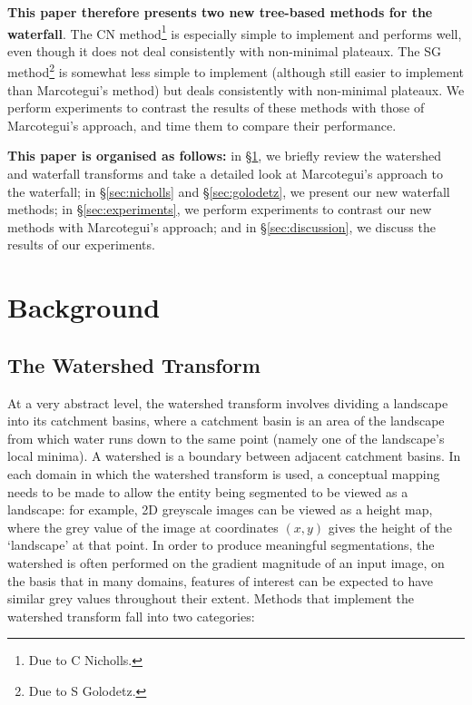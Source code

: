 \documentclass[preprint,a4paper]{elsarticle}
\begin{document}
\pagebreak

\textbf{This paper therefore presents two new tree-based methods for the waterfall}. The CN method\footnote{Due to C Nicholls.} is especially simple to implement and performs well, even though it does not deal consistently with non-minimal plateaux. The SG method\footnote{Due to S Golodetz.} is somewhat less simple to implement (although still easier to implement than Marcotegui's method) but deals consistently with non-minimal plateaux. We perform experiments to contrast the results of these methods with those of Marcotegui's approach, and time them to compare their performance.

\textbf{This paper is organised as follows:} in \S\ref{sec:background}, we briefly review the watershed and waterfall transforms and take a detailed look at Marcotegui's approach to the waterfall; in \S\ref{sec:nicholls} and \S\ref{sec:golodetz}, we present our new waterfall methods; in \S\ref{sec:experiments}, we perform experiments to contrast our new methods with Marcotegui's approach; and in \S\ref{sec:discussion}, we discuss the results of our experiments.

\section{Background}
\label{sec:background}

\subsection{The Watershed Transform}

At a very abstract level, the watershed transform involves dividing a landscape into its catchment basins, where a catchment basin is an area of the landscape from which water runs down to the same point (namely one of the landscape's local minima). A watershed is a boundary between adjacent catchment basins. In each domain in which the watershed transform is used, a conceptual mapping needs to be made to allow the entity being segmented to be viewed as a landscape: for example, 2D greyscale images can be viewed as a height map, where the grey value of the image at coordinates $(x,y)$ gives the height of the `landscape' at that point. In order to produce meaningful segmentations, the watershed is often performed on the gradient magnitude of an input image, on the basis that in many domains, features of interest can be expected to have similar grey values throughout their extent. Methods that implement the watershed transform fall into two categories:
\end{document}
